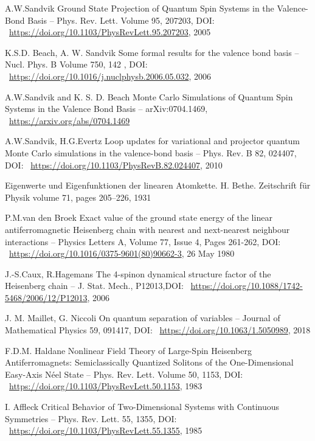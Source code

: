 \documentclass[11pt]{article}
\begin{document}
\begin{thebibliography}{3}
A.W.Sandvik Ground State Projection of Quantum Spin Systems in the Valence-Bond Basis -- Phys. Rev. Lett. Volume 95, 207203, DOI: ~\url{https://doi.org/10.1103/PhysRevLett.95.207203}, 2005

K.S.D. Beach, A. W. Sandvik Some formal results for the valence bond basis -- Nucl. Phys. B Volume 750, 142 , DOI: ~\url{https://doi.org/10.1016/j.nuclphysb.2006.05.032}, 2006

A.W.Sandvik and K. S. D. Beach Monte Carlo Simulations of Quantum Spin Systems in the Valence Bond Basis -- arXiv:0704.1469, ~\url{https://arxiv.org/abs/0704.1469}

A.W.Sandvik, H.G.Evertz Loop updates for variational and projector quantum Monte Carlo simulations in the valence-bond basis -- Phys. Rev. B 82, 024407, DOI: ~\url{https://doi.org/10.1103/PhysRevB.82.024407}, 2010

Eigenwerte und Eigenfunktionen der linearen Atomkette. H. Bethe. Zeitschrift für Physik volume 71, pages 205–226, 1931

P.M.van den Broek Exact value of the ground state energy of the linear antiferromagnetic Heisenberg chain with nearest and next-nearest neighbour interactions -- Physics Letters A, Volume 77, Issue 4, Pages 261-262, DOI: ~\url{https://doi.org/10.1016/0375-9601(80)90662-3}, 26 May 1980

J.-S.Caux, R.Hagemans The 4-spinon dynamical structure factor of the Heisenberg chain -- J. Stat. Mech., P12013,DOI: ~\url{https://doi.org/10.1088/1742-5468/2006/12/P12013}, 2006

J. M. Maillet, G. Niccoli On quantum separation of variables -- Journal of Mathematical Physics 59, 091417, DOI: ~\url{https://doi.org/10.1063/1.5050989}, 2018

F.D.M. Haldane Nonlinear Field Theory of Large-Spin Heisenberg Antiferromagnets: Semiclassically Quantized Solitons of the One-Dimensional Easy-Axis Néel State -- Phys. Rev. Lett. Volume 50, 1153, DOI: ~\url{https://doi.org/10.1103/PhysRevLett.50.1153}, 1983

I. Affleck Critical Behavior of Two-Dimensional Systems with Continuous Symmetries -- Phys. Rev. Lett. 55, 1355, DOI: ~\url{https://doi.org/10.1103/PhysRevLett.55.1355}, 1985


\end{thebibliography}
\end{document}
